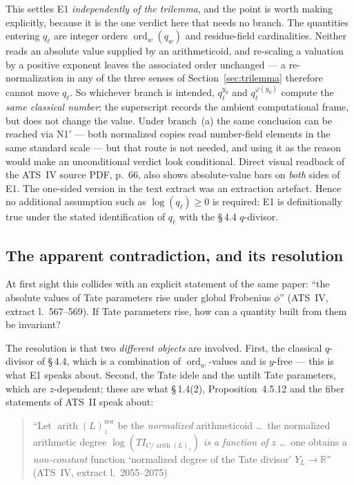 \documentclass[11pt,a4paper]{article}
\theoremstyle{definition}
\theoremstyle{plain}
\theoremstyle{definition}
\newcommand{\arith}{\operatorname{arith}}
\newcommand{\ordd}{\operatorname{ord}}
\newcommand{\Ynum}{Y_L}
\newcommand{\anchor}[2]{(#1, extract l.~#2)}
\begin{document}
This settles E1 \emph{independently of the trilemma}, and the point is worth
making explicitly, because it is the one verdict here that needs no branch. The
quantities entering $q_\ell$ are integer orders $\ordd_w(q_w)$ and residue-field
cardinalities. Neither reads an absolute value supplied by an arithmeticoid, and
re-scaling a valuation by a positive exponent leaves the associated order
unchanged --- a re-normalization in any of the three senses of
Section~\ref{sec:trilemma} therefore cannot move $q_\ell$. So whichever branch is
intended, $q_\ell^{y_0}$ and $q_\ell^{\varphi(y_0)}$ compute the \emph{same
classical number}; the superscript records the ambient computational frame, but
does not change the value. Under branch~(a) the same conclusion can be reached via
N1$'$ --- both normalized copies read number-field elements in the same standard
scale --- but that route is not needed, and using it as the reason would make an
unconditional verdict look conditional. Direct visual readback of the ATS~IV
source PDF, p.~66, also shows absolute-value bars on \emph{both} sides of E1. The
one-sided version in the text extract was an extraction artefact. Hence no
additional assumption such as $\log(q_\ell)\ge 0$ is required: E1 is
definitionally true under the stated identification of $q_\ell$ with the
\S\,4.4 $q$-divisor.

\subsection{The apparent contradiction, and its resolution}

At first sight this collides with an explicit statement of the same paper: ``the
absolute values of Tate parameters rise under global Frobenius $\phi$''
\anchor{ATS~IV}{567--569}. If Tate parameters rise, how can a quantity built from
them be invariant?

The resolution is that two \emph{different objects} are involved. First, the
classical $q$-divisor of \S\,4.4, which is a combination of $\ordd_w$-values and
is $y$-free --- this is what E1 speaks about. Second, the Tate idele and the
untilt Tate parameters, which are $z$-dependent; these are what
\S\,1.4(2), Proposition~4.5.12 and the fiber statements of ATS~II speak about:

\begin{quote}\small
``Let $\arith(L)^{\mathrm{nor}}_z$ be the \emph{normalized} arithmeticoid \ldots\
the normalized arithmetic degree $\log(TI_{C/\arith(L)_z})$ \emph{is a function of
$z$} \ldots\ one obtains a \emph{non-constant} function `normalized degree of the
Tate divisor' $\Ynum \to \mathbb{R}$'' \hfill\anchor{ATS~IV}{2055--2075}
\end{quote}
\end{document}
